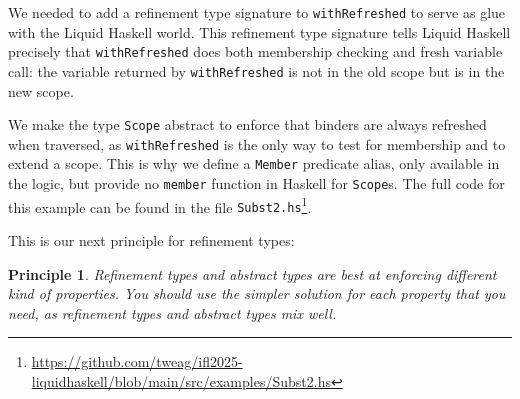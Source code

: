\documentclass[sigconf, review]{acmart}
\newcommand{\tc}[1]{{\small\texttt{#1}}}
\newcommand{\sourcefile}[1]{\tc{#1}\footnote{\scriptsize\url{https://github.com/tweag/ifl2025-liquidhaskell/blob/main/src/examples/#1}}}
\newtheorem{principle}{Principle}
\begin{document}
We needed to add a refinement type signature to \tc{withRefreshed} to serve as
glue with the Liquid Haskell world. This refinement type signature tells Liquid
Haskell precisely that \tc{withRefreshed} does both membership checking and
fresh variable call: the variable returned by \tc{withRefreshed} is not in the
old scope but is in the new scope.

We make the type \tc{Scope} abstract to enforce that binders are always
refreshed when traversed, as \tc{withRefreshed} is the only
way to test for membership and to extend a scope. This is why we define a
\tc{Member} predicate alias, only available in the logic, but provide no
\tc{member} function in Haskell for \tc{Scope}s.
The full code for this example can be found in the
file \sourcefile{Subst2.hs}.

This is our next principle for refinement types:
\begin{principle}
  Refinement types and abstract types are best at enforcing different kind of
  properties. You should use the simpler solution for each property that you
  need, as refinement types and abstract types mix well.
\end{principle}




\end{document}
